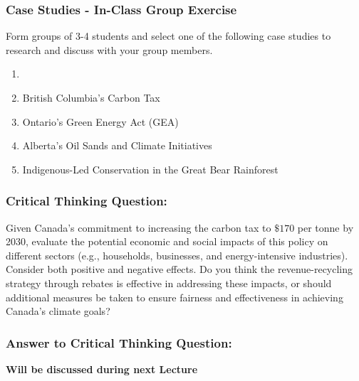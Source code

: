 \documentclass[blue]{beamer}
\begin{document}
     \begin{frame} \frametitle{Case Studies - In-Class Group Exercise}
\label{GHG comparison}

Form groups of 3-4 students and select one of the following case studies to research and discuss with your group members.

\begin{enumerate}
\item[]
\item British Columbia's Carbon Tax
\item Ontario's Green Energy Act (GEA)
\item Alberta's Oil Sands and Climate Initiatives
\item Indigenous-Led Conservation in the Great Bear Rainforest
\end{enumerate}

 \end{frame}

      \begin{frame} \frametitle{Critical Thinking Question:}
\label{GHG comparison}

Given Canada's commitment to increasing the carbon tax to $\$ 170$ per tonne by 2030, evaluate the potential economic and social impacts of this policy on different sectors (e.g., households, businesses, and energy-intensive industries). Consider both positive and negative effects. Do you think the revenue-recycling strategy through rebates is effective in addressing these impacts, or should additional measures be taken to ensure fairness and effectiveness in achieving Canada's climate goals?

 \end{frame}




     \begin{frame} \frametitle{Answer to Critical Thinking Question:}
\label{GHG comparison}

\textbf{Will be discussed during next Lecture}

 \end{frame}
\end{document}
